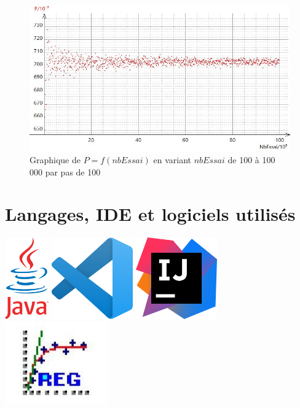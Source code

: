 \documentclass{report}
\begin{document}
\begin{figure}[H]
	\includegraphics[width=\textwidth]{../graphe/PE3C(n).jpg}
	\caption{Graphique de $P=f(nbEssai)$ en variant $nbEssai$ de 100 à 100 000 par pas de 100}
\end{figure}	























\appendix
\chapter{Langages, IDE et logiciels utilisés}

\centering
  \includegraphics[height=3.5cm]{../graphe/java.png}\qquad
  \includegraphics[height=3.5cm]{../graphe/Vscode.png}\qquad
  \includegraphics[height=3.5cm]{../graphe/idea.png} \qquad
  \includegraphics[height=3.5cm]{../graphe/regressi.jpg}
\centering
\end{document}
